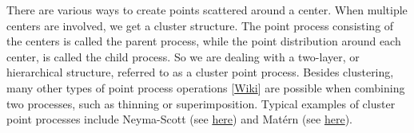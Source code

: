\documentclass[10pt]{article}
\begin{document}
There are various ways to create points scattered around a center. When multiple centers are involved, we get a cluster structure. The point process consisting of the centers is called the \textcolor{index}{parent process}, while the point distribution around each center, is called the \textcolor{index}{child process}. So we are dealing with a two-layer, or hierarchical structure, referred to as a \textcolor{index}{cluster point process}. Besides clustering, many other types of \textcolor{index}{point process operations} [\href{https://en.wikipedia.org/wiki/Point_process_operation}{Wiki}] are possible when combining two processes, such as thinning or superimposition. Typical examples of cluster point processes include
\textcolor{index}{Neyma-Scott} (see \href{https://hpaulkeeler.com/tag/neyman-scott-point-process/}{here}) and
\textcolor{index}{Matérn} (see \href{https://hpaulkeeler.com/simulating-a-thomas-cluster-point-process/}{here}).
\end{document}
